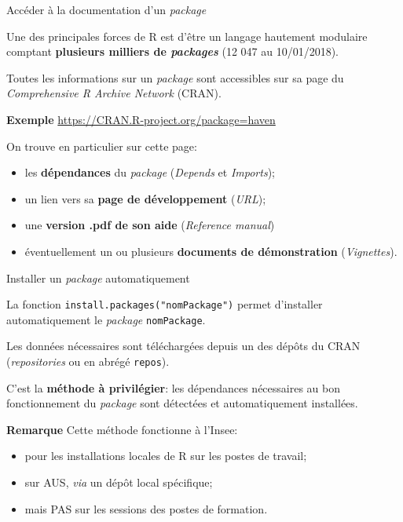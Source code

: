 \documentclass[12pt,ignorenonframetext,]{beamer}
\providecommand{\tightlist}{%
  \setlength{\itemsep}{0pt}\setlength{\parskip}{0pt}}
\begin{document}
\begin{frame}{Accéder à la documentation d'un \emph{package}}

Une des principales forces de R est d'être un langage hautement
modulaire comptant \textbf{plusieurs milliers de \emph{packages}} (12
047 au 10/01/2018).

\pause Toutes les informations sur un \emph{package} sont accessibles
sur sa page du \emph{Comprehensive R Archive Network} (CRAN).

\textbf{Exemple} \url{https://CRAN.R-project.org/package=haven}

\pause \bigskip On trouve en particulier sur cette page:

\begin{itemize}
\tightlist
\item
  les \textbf{dépendances} du \emph{package} (\emph{Depends} et
  \emph{Imports});
\item
  un lien vers sa \textbf{page de développement} (\emph{URL});
\item
  une \textbf{version .pdf de son aide} (\emph{Reference manual})
\item
  éventuellement un ou plusieurs \textbf{documents de démonstration}
  (\emph{Vignettes}).
\end{itemize}

\end{frame}

\begin{frame}[fragile]{Installer un \emph{package} automatiquement}

La fonction \texttt{install.packages("nomPackage")} permet d'installer
automatiquement le \emph{package} \texttt{nomPackage}.

Les données nécessaires sont téléchargées depuis un des dépôts du CRAN
(\emph{repositories} ou en abrégé \texttt{repos}).

C'est la \textbf{méthode à privilégier}: les dépendances nécessaires au
bon fonctionnement du \emph{package} sont détectées et automatiquement
installées.

\pause 

\textbf{Remarque} Cette méthode fonctionne à l'Insee:

\begin{itemize}
\tightlist
\item
  pour les installations locales de R sur les postes de travail;
\item
  sur AUS, \emph{via} un dépôt local spécifique;
\item
  mais PAS sur les sessions des postes de formation.
\end{itemize}

\end{frame}
\end{document}
